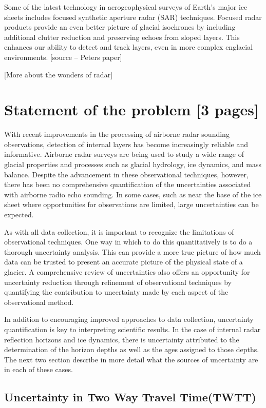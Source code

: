 \documentclass[draft,jgrga]{agutex}
\begin{document}
Some of the latest technology in aerogeophysical surveys of Earth’s
	major ice sheets includes focused synthetic aperture radar
	(SAR) techniques. Focused radar products provide an even
	better picture of glacial isochrones by including additional
	clutter reduction and preserving echoes from sloped
	layers. This enhances our ability to detect and track layers,
	even in more complex englacial environments. [source – Peters
	paper] 

[More about the wonders of radar] 

\section{Statement of the problem [3 pages] }

With recent improvements in the processing of airborne radar sounding
observations, detection of internal layers has become increasingly
reliable and informative. Airborne radar surveys are being used to
study a wide range of glacial properties and processes such as glacial
hydrology, ice dynamics, and mass balance. Despite the advancement in
these observational techniques, however, there has been no
comprehensive quantification of the uncertainties associated with
airborne radio echo sounding. In some cases, such as near the base of
the ice sheet where opportunities for observations are limited, large
uncertainties can be expected. 

As with all data collection, it is important to recognize the
limitations of observational techniques. One way in which to do this
quantitatively is to do a thorough uncertainty analysis. This can
provide a more true picture of how much data can be trusted to present
an accurate picture of the physical state of a glacier. A
comprehensive review of uncertainties also offers an opportunity for
uncertainty reduction through refinement of observational techniques
by quantifying the contribution to uncertainty made by each aspect of
the observational method.

In addition to encouraging improved approaches to data collection,
uncertainty quantification is key to interpreting scientific
results. In the case of internal radar reflection horizons and ice
dynamics, there is uncertainty attributed to the determination of the
horizon depths as well as the ages assigned to those depths. The next
two section describe in more detail what the sources of uncertainty
are in each of these cases.

\subsection{Uncertainty in Two Way Travel Time(TWTT)}
\end{document}
